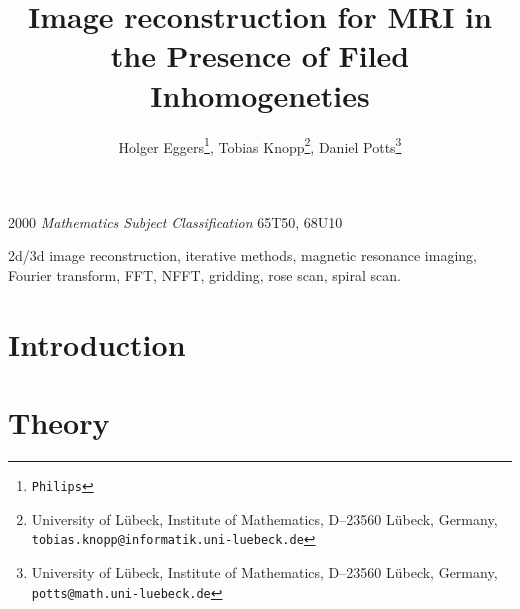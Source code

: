 \documentclass[journal]{IEEEtran}
\title{Image reconstruction for MRI in the Presence of
  Filed Inhomogeneties}
\author{
Holger Eggers\thanks{\tt Philips},
Tobias Knopp\thanks{University of L\"ubeck,
Institute of Mathematics,
D--23560 L\"ubeck,
Germany, {\tt tobias.knopp@informatik.uni-luebeck.de}}, 
Daniel Potts\thanks{University of L\"ubeck,
Institute of Mathematics,
D--23560 L\"ubeck,
Germany, {\tt potts@math.uni-luebeck.de}}
}
\numberwithin{equation}{section}
\numberwithin{table}{section}
\numberwithin{figure}{section}
\begin{document}

\maketitle


\begin{abstract}

\end{abstract}

2000 {\it Mathematics Subject Classification} 65T50, 68U10

\begin{keywords}
2d/3d image reconstruction, iterative methods, magnetic resonance imaging, Fourier transform, FFT, NFFT, gridding, rose scan, spiral scan.
\end{keywords}


\section{Introduction}
\section{Theory}\label{Sec:Th}
\end{document}
